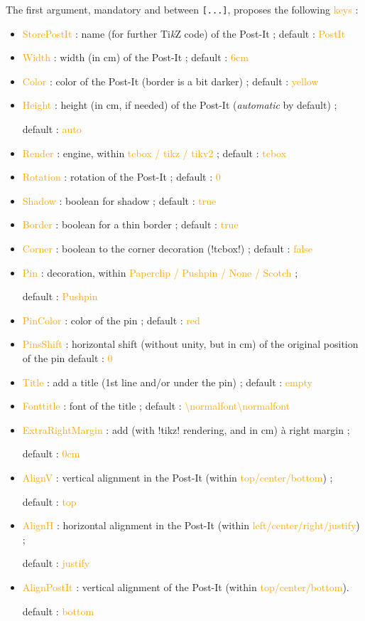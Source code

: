 \documentclass[english,a4paper,11pt]{article}
\providecommand\tikzlogo{Ti\textit{k}Z}
\let\TikZ\tikzlogo
\newcommand\Cle[1]{{\small\sffamily\textlangle \textcolor{orange}{#1}\textrangle}}
\newcommand\cmaj[1]{\tcbox[vignetteMaJ]{#1}\xspace}
\begin{document}
\begin{tipblock}
The first argument, mandatory and between \texttt{[...]}, proposes the following \Cle{keys} :

\begin{itemize}
	\item \cmaj{0.1.3} \Cle{StorePostIt} : name (for further \TikZ{} code) of the Post-It ; \hfill{}default : \Cle{PostIt}
	\item \Cle{Width} : width (in cm) of the Post-It  ; \hfill{}default : \Cle{6cm}
	\item \Cle{Color} : color of the Post-It (border is a bit darker) ; \hfill{}default : \Cle{yellow}
	\item \Cle{Height} : height (in cm, if needed) of the Post-It (\textit{automatic} by default) ;
	
	\hfill{}default : \Cle{auto}
	\item \cmaj{0.1.1} \Cle{Render} : engine, within \Cle{tcbox / tikz / tikv2} ; \hfill{}default : \Cle{tcbox}
	\item \Cle{Rotation} : rotation of the Post-It ; \hfill{}default : \Cle{0}
	\item \Cle{Shadow} : boolean for shadow ; \hfill{}default : \Cle{true}
	\item \Cle{Border} : boolean for a thin border ; \hfill{}default : \Cle{true}
	\item \Cle{Corner} : boolean to the corner decoration (\motcletex!tcbox!) ; \hfill{}default : \Cle{false}
	\item \Cle{Pin} : decoration, within \Cle{Paperclip / Pushpin / None / Scotch} ;
	
	\hfill{}default : \Cle{Pushpin}
	\item \Cle{PinColor} : color of the pin ; \hfill{}default : \Cle{red}
	\item \Cle{PinsShift} : horizontal shift (without unity, but in cm) of the original position of the pin \hfill{}default : \Cle{0}
	\item \cmaj{0.1.1} \Cle{Title} : add a title (1st line and/or under the pin) ; \hfill{}default : \Cle{empty}
	\item \cmaj{0.1.1} \Cle{Fonttitle} : font of the title ; \hfill{}default : \Cle{\textbackslash normalfont\textbackslash normalfont}
	\item \cmaj{0.1.1} \Cle{ExtraRightMargin} : add (with \packagetex!tikz! rendering, and in cm) à right margin ;
	
	\hfill{}default : \Cle{0cm}
	\item \Cle{AlignV} : vertical alignment in the Post-It (within \Cle{top/center/bottom}) ;
	
	\hfill{}default : \Cle{top}
	\item \Cle{AlignH} : horizontal alignment in the Post-It (within \Cle{left/center/right/justify}) ;
	
	\hfill{}default : \Cle{justify}
	\item \Cle{AlignPostIt} : vertical alignment of the Post-It (within \Cle{top/center/bottom}).
	
	\hfill{}default : \Cle{bottom}
\end{itemize}
\vspace*{-\baselineskip}\leavevmode
\end{tipblock}
\end{document}
